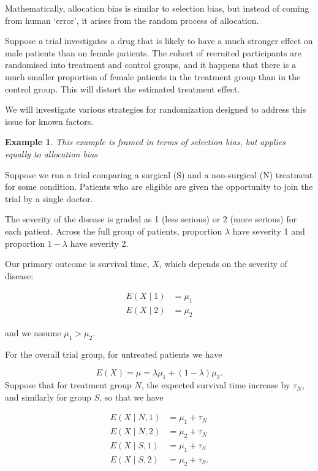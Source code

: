 \documentclass[
  openany]{book}
\theoremstyle{definition}
\theoremstyle{definition}
\newtheorem{example}{Example}[chapter]
\theoremstyle{definition}
\theoremstyle{definition}
\theoremstyle{remark}
\begin{document}
Mathematically, allocation bias is similar to selection bias, but instead of coming from human `error', it arises from the random process of allocation.

Suppose a trial investigates a drug that is likely to have a much stronger effect on male patients than on female patients. The cohort of recruited participants are randomised into treatment and control groups, and it happens that there is a much smaller proportion of female patients in the treatment group than in the control group. This will distort the estimated treatment effect.

We will investigate various strategies for randomization designed to address this issue for known factors.

\begin{example}
\emph{This example is framed in terms of selection bias, but applies equally to allocation bias}

Suppose we run a trial comparing a surgical (S) and a non-surgical (N) treatment for some condition. Patients who are eligible are given the opportunity to join the trial by a single doctor.

The severity of the disease is graded as 1 (less serious) or 2 (more serious) for each patient. Across the full group of patients, proportion \(\lambda\) have severity 1 and proportion \(1-\lambda\) have severity 2.

Our primary outcome is survival time, \(X\), which depends on the severity of disease:

\begin{align*}
E\left(X\mid{1}\right) & = \mu_1\\
E\left(X\mid{2}\right) & = \mu_2
\end{align*}

and we assume \(\mu_1>\mu_2\).

For the overall trial group, for untreated patients we have

\[ E\left(X\right) = \mu = \lambda \mu_1 + \left(1-\lambda\right)\mu_2.\]
Suppose that for treatment group \(N\), the expected survival time increase by \(\tau_N\), and similarly for group \(S\), so that we have

\begin{align*}
E\left(X\mid{N,1}\right) & = \mu_1 + \tau_N\\
E\left(X\mid{N,2}\right) & = \mu_2 + \tau_N\\
E\left(X\mid{S,1}\right) & = \mu_1 + \tau_S\\
E\left(X\mid{S,2}\right) & = \mu_2 + \tau_S.
\end{align*}


\end{example}
\end{document}

